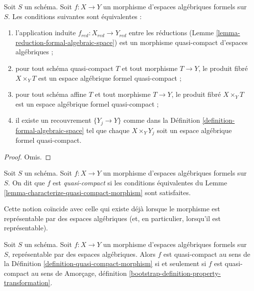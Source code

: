\begin{lemma}
\label{lemma-characterize-quasi-compact-morphism}
Soit $S$ un schéma. Soit $f : X \to Y$ un morphisme d'espaces algébriques
formels sur $S$. Les conditions suivantes sont équivalentes :
\begin{enumerate}
\item l'application induite $f_{red} : X_{red} \to Y_{red}$ entre les réductions
(Lemme \ref{lemma-reduction-formal-algebraic-space}) est un morphisme
quasi-compact d'espaces algébriques ;
\item pour tout schéma quasi-compact $T$ et tout morphisme $T \to Y$,
le produit fibré $X \times_Y T$ est un espace algébrique formel
quasi-compact ;
\item pour tout schéma affine $T$ et tout morphisme $T \to Y$,
le produit fibré $X \times_Y T$ est un espace algébrique formel
quasi-compact ;
\item il existe un recouvrement $\{Y_j \to Y\}$ comme dans la
Définition \ref{definition-formal-algebraic-space}
tel que chaque $X \times_Y Y_j$ soit un espace algébrique formel quasi-compact.
\end{enumerate}
\end{lemma}

\begin{proof}
Omis.
\end{proof}

\begin{definition}
\label{definition-quasi-compact-morphism}
Soit $S$ un schéma. Soit $f : X \to Y$ un morphisme
d'espaces algébriques formels sur $S$.
On dit que $f$ est {\it quasi-compact} si les conditions équivalentes du
Lemme \ref{lemma-characterize-quasi-compact-morphism} sont satisfaites.
\end{definition}

\noindent
Cette notion coïncide avec celle qui existe déjà lorsque le morphisme
est représentable par des espaces algébriques (et, en particulier, lorsqu'il est
représentable).

\begin{lemma}
\label{lemma-quasi-compact-representable}
Soit $S$ un schéma. Soit $f : X \to Y$ un morphisme d'espaces algébriques
formels sur $S$, représentable par des espaces algébriques.
Alors $f$ est quasi-compact au sens de la
Définition \ref{definition-quasi-compact-morphism}
si et seulement si $f$ est quasi-compact au sens de
Amorçage, définition \ref{bootstrap-definition-property-transformation}.
\end{lemma}

